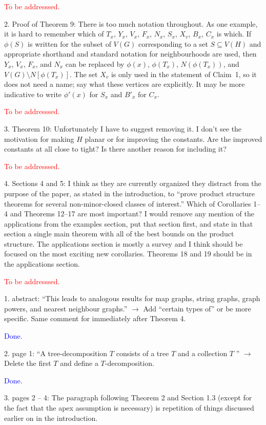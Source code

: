 \documentclass[12pt]{article}
\newcommand{\done}{\textcolor{blue}{Done.}}
\newcommand{\tba}{\textcolor{red}{To be addresssed.}}
\begin{document}
\tba

2. Proof of Theorem 9: There is too much notation throughout. As
one example, it is hard to remember which of $T_x$, $Y_x$, $V_x$, $F_x$, $N_x$,
$S_x$, $X_v$, $B_x$, $C_x$ is which. If $\phi(S)$ is written for the subset of $V(G)$
corresponding to a set $S \subseteq V(H)$ and appropriate shorthand and
standard notation for neighbourhoods are used, then $Y_x$, $V_x$, $F_x$, and
$N_x$ can be replaced by $\phi(x)$, $\phi(T_x)$, $N(\phi(T_x))$, and $V(G) \setminus N[\phi(T_x)]$.
The set $X_v$ is only used in the statement of Claim~1, so it does not
need a name; say what these vertices are explicitly. It may be more
indicative to write $\phi'(x)$ for $S_x$ and $B'_x$ for $C_x$.

\tba

3. Theorem 10: Unfortunately I have to suggest removing it. I don’t see
the motivation for making $H$ planar or for improving the constants.
Are the improved constants at all close to tight? Is there another
reason for including it?

\tba

4. Sections 4 and 5: I think as they are currently organized they distract from the purpose of the paper, as stated in the introduction, to ``prove product structure theorems for several non-minor-closed classes of interest.'' Which of Corollaries 1--4 and Theorems 12--17 are most important? I would remove any mention of the applications from the examples section, put that section first, and state in that section a single main theorem with all of the best bounds on the product structure. The applications section is mostly a survey and I think should be focused on the most exciting new corollaries. Theorems 18 and 19 should be in the applications section.

\tba

1. abstract: ``This leads to analogous results for map graphs, string graphs, graph powers, and nearest neighbour graphs.'' $\longrightarrow$ 
Add ``certain types of'' or be more specific. Same comment for immediately after Theorem 4.

\done

2. page 1: ``A tree-decomposition $T$ consists of a tree $T$ and a collection
$T$ '' $\longrightarrow$ Delete the first $T$ and define a $T$-decomposition.

\done

3. pages 2 – 4: The paragraph following Theorem 2 and Section 1.3
(except for the fact that the apex assumption is necessary) is repetition
of things discussed earlier on in the introduction.
\end{document}
